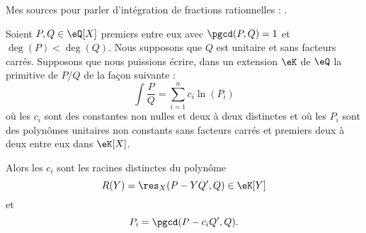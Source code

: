 Mes sources pour parler d'intégration de fractions rationnelles : \cite{MKucxNb,CPheFRq,LTjwacY,KXjFWKA}.

\begin{theorem}
    Soient \( P,Q\in \eQ[X]\) premiers entre eux avec \( \pgcd(P,Q)=1\) et \( \deg(P)<\deg(Q)\). Nous supposons que \( Q\) est unitaire et sans facteurs carrés. Supposons que nous puissions écrire, dans un extension \( \eK\) de \( \eQ\) la primitive de \( P/Q\) de la façon suivante :
    \begin{equation}        \label{EqCHVaDay}
        \int\frac{ P }{ Q }=\sum_{i=1}^n c_i\ln(P_i)
    \end{equation}
    où les \( c_i\) sont des constantes non nulles et deux à deux distinctes et où les \( P_i\) sont des polynômes unitaires non constants sans facteurs carrés et premiers deux à deux entre eux dans \( \eK[X]\).

    Alors les \( c_i\) sont les racines distinctes du polynôme
    \begin{equation}
        R(Y)=\res_X(P-YQ',Q)\in \eK[Y]
    \end{equation}
    et
    \begin{equation}
        P_i=\pgcd(P-c_iQ',Q).
    \end{equation}
\end{theorem}

